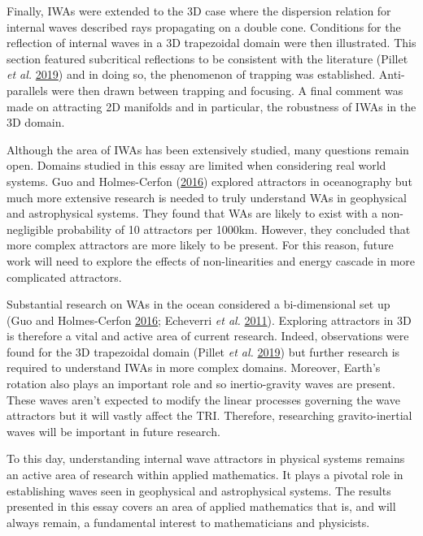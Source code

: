 \documentclass[a4paper]{article}
\numberwithin{equation}{section}
\begin{document}
Finally, IWAs were extended to the 3D case where the dispersion relation for internal waves described rays propagating on a double cone. Conditions for the reflection of internal waves in a 3D trapezoidal domain were then illustrated. This section featured subcritical reflections to be consistent with the literature (Pillet \emph{et al.} \hyperlink{ref 37}{2019}) and in doing so, the phenomenon of trapping was established. Anti-parallels were then drawn between trapping and focusing. A final comment was made on attracting 2D manifolds and in particular, the robustness of IWAs in the 3D domain. 

Although the area of IWAs has been extensively studied, many questions remain open. Domains studied in this essay are limited when considering real world systems. Guo and Holmes-Cerfon (\hyperlink{ref 42}{2016}) explored attractors in oceanography but much more extensive research is needed to truly understand WAs in geophysical and astrophysical systems. They found that WAs are likely to exist with a non-negligible probability of 10 attractors per 1000km. However, they concluded that more complex attractors are more likely to be present. For this reason, future work will need to explore the effects of non-linearities and energy cascade in more complicated attractors. 

Substantial research on WAs in the ocean considered a bi-dimensional set up (Guo and Holmes-Cerfon \hyperlink{ref 42}{2016}; Echeverri \emph{et al.} \hyperlink{ref 43}{2011}). Exploring attractors in 3D is therefore a vital and active area of current research. Indeed, observations were found for the 3D trapezoidal domain (Pillet \emph{et al.} \hyperlink{ref 37}{2019}) but further research is required to understand IWAs in more complex domains. Moreover, Earth's rotation also plays an important role and so inertio-gravity waves are present. These waves aren't expected to modify the linear processes governing the wave attractors but it will vastly affect the TRI. Therefore, researching gravito-inertial waves will be important in future research. 

To this day, understanding internal wave attractors in physical systems remains an active area of research within applied mathematics. It plays a pivotal role in establishing waves seen in geophysical and astrophysical systems. The results presented in this essay covers an area of applied mathematics that is, and will always remain, a fundamental interest to mathematicians and physicists.

\end{document}
